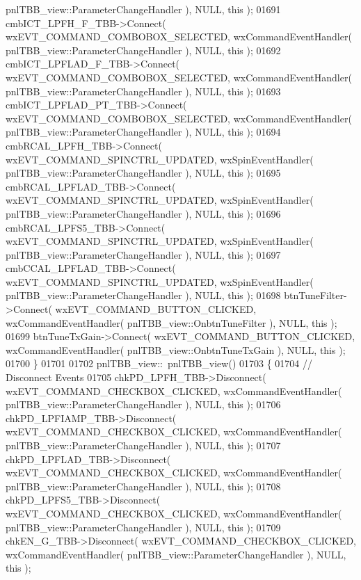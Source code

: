 \begin{DoxyCode}
      pnlTBB_view::ParameterChangeHandler ), NULL, \textcolor{keyword}{this} );
01691     cmbICT_LPFH_F_TBB->Connect( wxEVT\_COMMAND\_COMBOBOX\_SELECTED, wxCommandEventHandler( 
      pnlTBB_view::ParameterChangeHandler ), NULL, \textcolor{keyword}{this} );
01692     cmbICT_LPFLAD_F_TBB->Connect( wxEVT\_COMMAND\_COMBOBOX\_SELECTED, wxCommandEventHandler( 
      pnlTBB_view::ParameterChangeHandler ), NULL, \textcolor{keyword}{this} );
01693     cmbICT_LPFLAD_PT_TBB->Connect( wxEVT\_COMMAND\_COMBOBOX\_SELECTED, wxCommandEventHandler( 
      pnlTBB_view::ParameterChangeHandler ), NULL, \textcolor{keyword}{this} );
01694     cmbRCAL_LPFH_TBB->Connect( wxEVT\_COMMAND\_SPINCTRL\_UPDATED, wxSpinEventHandler( 
      pnlTBB_view::ParameterChangeHandler ), NULL, \textcolor{keyword}{this} );
01695     cmbRCAL_LPFLAD_TBB->Connect( wxEVT\_COMMAND\_SPINCTRL\_UPDATED, wxSpinEventHandler( 
      pnlTBB_view::ParameterChangeHandler ), NULL, \textcolor{keyword}{this} );
01696     cmbRCAL_LPFS5_TBB->Connect( wxEVT\_COMMAND\_SPINCTRL\_UPDATED, wxSpinEventHandler( 
      pnlTBB_view::ParameterChangeHandler ), NULL, \textcolor{keyword}{this} );
01697     cmbCCAL_LPFLAD_TBB->Connect( wxEVT\_COMMAND\_SPINCTRL\_UPDATED, wxSpinEventHandler( 
      pnlTBB_view::ParameterChangeHandler ), NULL, \textcolor{keyword}{this} );
01698     btnTuneFilter->Connect( wxEVT\_COMMAND\_BUTTON\_CLICKED, wxCommandEventHandler( 
      pnlTBB_view::OnbtnTuneFilter ), NULL, \textcolor{keyword}{this} );
01699     btnTuneTxGain->Connect( wxEVT\_COMMAND\_BUTTON\_CLICKED, wxCommandEventHandler( 
      pnlTBB_view::OnbtnTuneTxGain ), NULL, \textcolor{keyword}{this} );
01700 \}
01701 
01702 pnlTBB_view::~pnlTBB_view()
01703 \{
01704     \textcolor{comment}{// Disconnect Events}
01705     chkPD_LPFH_TBB->Disconnect( wxEVT\_COMMAND\_CHECKBOX\_CLICKED, wxCommandEventHandler( 
      pnlTBB_view::ParameterChangeHandler ), NULL, \textcolor{keyword}{this} );
01706     chkPD_LPFIAMP_TBB->Disconnect( wxEVT\_COMMAND\_CHECKBOX\_CLICKED, wxCommandEventHandler( 
      pnlTBB_view::ParameterChangeHandler ), NULL, \textcolor{keyword}{this} );
01707     chkPD_LPFLAD_TBB->Disconnect( wxEVT\_COMMAND\_CHECKBOX\_CLICKED, wxCommandEventHandler( 
      pnlTBB_view::ParameterChangeHandler ), NULL, \textcolor{keyword}{this} );
01708     chkPD_LPFS5_TBB->Disconnect( wxEVT\_COMMAND\_CHECKBOX\_CLICKED, wxCommandEventHandler( 
      pnlTBB_view::ParameterChangeHandler ), NULL, \textcolor{keyword}{this} );
01709     chkEN_G_TBB->Disconnect( wxEVT\_COMMAND\_CHECKBOX\_CLICKED, wxCommandEventHandler( 
      pnlTBB_view::ParameterChangeHandler ), NULL, \textcolor{keyword}{this} );

\end{DoxyCode}
